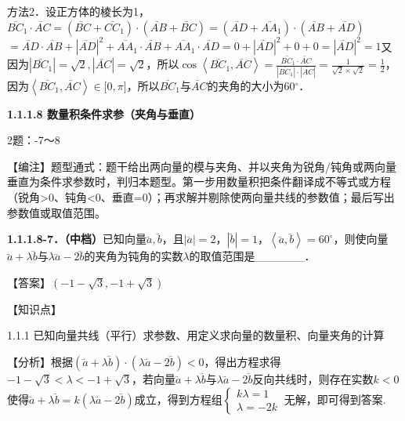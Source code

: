 方法2．设正方体的棱长为1，\(\overset{⃑}{BC_{1}} \cdot \overset{⃑}{AC} = \left( \overset{⃑}{BC} + \overset{⃑}{CC_{1}} \right) \cdot \left( \overset{⃑}{AB} + \overset{⃑}{BC} \right) = \left( \overset{⃑}{AD} + \overset{⃑}{AA_{1}} \right) \cdot \left( \overset{⃑}{AB} + \overset{⃑}{AD} \right)\)\(= \overset{⃑}{AD} \cdot \overset{⃑}{AB} + \left| \overset{⃑}{AD} \right|^{2} + \overset{⃑}{AA_{1}} \cdot \overset{⃑}{AB} + \overset{⃑}{AA_{1}} \cdot \overset{⃑}{AD} = 0 + \left| \overset{⃑}{AD} \right|^{2} + 0 + 0 = \left| \overset{⃑}{AD} \right|^{2} = 1\)又因为\(\left| \overset{⃑}{BC_{1}} \right| = \sqrt{2},\left| \overset{⃑}{AC} \right| = \sqrt{2}\)，所以\(\cos\left\langle \overset{⃑}{BC_{1}},\overset{⃑}{AC} \right\rangle = \frac{\overset{⃑}{BC_{1}} \cdot \overset{⃑}{AC}}{\left| \overset{⃑}{BC_{1}} \right| \cdot \left| \overset{⃑}{AC} \right|} = \frac{1}{\sqrt{2} \times \sqrt{2}} = \frac{1}{2}\)，
因为\(\left\langle \overset{⃑}{BC_{1}},\overset{⃑}{AC} \right\rangle \in \lbrack 0,\pi\rbrack\)，所以\(\overset{⃑}{BC_{1}}\)与\(\overset{⃑}{AC}\)的夹角的大小为\(60{^\circ}\)．

\textbf{1.1.1.8 数量积条件求参（夹角与垂直）}

2题：-7～8

【⁠编⁠注⁠】题型通式：题干给出两向量的模与夹角、并以夹角为锐角/钝角或两向量垂直为条件求参数时，判归本题型。第一步用数量积把条件翻译成不等式或方程（锐角\textgreater0、钝角\textless0、垂直=0）；再求解并剔除使两向量共线的参数值；最后写出参数值或取值范围。

\textbf{1.1.1.8-7．（中档）}已知向量\(\overset{⃑}{a},\overset{⃑}{b}\)，且\(\left| \overset{⃑}{a} \right| = 2\)，\(\left| \overset{⃑}{b} \right| = 1\)，\(\left\langle \overset{⃑}{a},\overset{⃑}{b} \right\rangle = 60^{\circ}\)，则使向量\(\overset{⃑}{a} + \lambda\overset{⃑}{b}\)与\(\lambda\overset{⃑}{a} - 2\overset{⃑}{b}\)的夹角为钝角的实数\(\lambda\)的取值范围是\_\_\_\_\_\_．

【⁠答⁠案⁠】\(\left( - 1 - \sqrt{3}, - 1 + \sqrt{3} \right)\)

【⁠知⁠识⁠点⁠】

1.1.1 已知向量共线（平行）求参数、用定义求向量的数量积、向量夹角的计算

【⁠分⁠析⁠】根据\(\left( \overset{⃑}{a} + \lambda\overset{⃑}{b} \right) \cdot \left( \lambda\overset{⃑}{a} - 2\overset{⃑}{b} \right) < 0\)，得出方程求得\(- 1 - \sqrt{3} < \lambda < - 1 + \sqrt{3}\)，若向量\(\overset{⃑}{a} + \lambda\overset{⃑}{b}\)与\(\lambda\overset{⃑}{a} - 2\overset{⃑}{b}\)反向共线时，则存在实数\(k < 0\)使得\(\overset{⃑}{a} + \lambda\overset{⃑}{b} = k(\lambda\overset{⃑}{a} - 2\overset{⃑}{b})\)成立，得到方程组\(\left\{ \begin{array}{r}
k\lambda = 1 \\
\lambda = - 2k
\end{array} \right.\ \)无解，即可得到答案.

